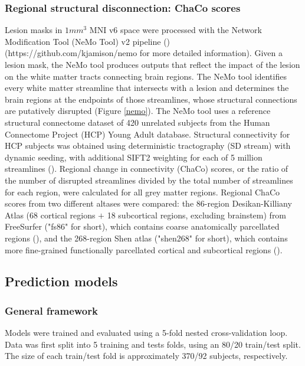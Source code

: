 \documentclass[10pt]{article}
\def\Plus{\texttt{+}}
\begin{document}
\subsubsection*{Regional structural disconnection: ChaCo scores}

Lesion masks in $1mm^3$ MNI v6 space were processed with the Network Modification Tool (NeMo Tool) v2 pipeline (\cite{Kuceyeski2013-nk}) (https://github.com/kjamison/nemo for more detailed information). Given a lesion mask, the NeMo tool produces outputs that reflect the impact of the lesion on the white matter tracts connecting brain regions. The NeMo tool identifies every white matter streamline that intersects with a lesion and determines the brain regions at the endpoints of those streamlines, whose structural connections are putatively disrupted (Figure \ref{nemo}). The NeMo tool uses a reference structural connectome dataset of 420 unrelated subjects from the Human Connectome Project (HCP) Young Adult database. Structural connectivity for HCP subjects was obtained using deterministic tractography (SD stream) with dynamic seeding, with additional SIFT2 weighting for each of 5 million streamlines (\cite{Smith2015-eb}). Regional change in connectivity (ChaCo) scores, or the ratio of the number of disrupted streamlines divided by the total number of streamlines for each region, were calculated for all grey matter regions. Regional ChaCo scores from two different altases were compared: the 86-region Desikan-Killiany Atlas (68 cortical regions $\Plus$ 18 subcortical regions, excluding brainstem) from FreeSurfer ("fs86" for short), which contains coarse anatomically parcellated regions (\cite{Desikan2006-vf,Fischl2002-lb}), and the 268-region Shen atlas ("shen268" for short), which contains more fine-grained functionally parcellated cortical and subcortical regions (\cite{Shen2013-zn}).


\subsection{Prediction models}
\subsubsection*{General framework}

Models were trained and evaluated using a 5-fold nested cross-validation loop. Data was first split into 5 training and tests folds, using an 80/20 train/test split. The size of each train/test fold is approximately 370/92 subjects, respectively. 
\end{document}

